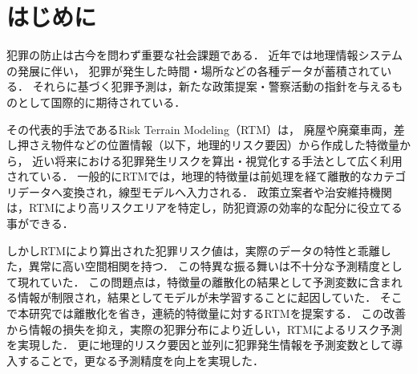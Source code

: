\def\Style{``jsaiac.sty''}
\def\BibTeX{{\rm B\kern-.05em{\sc i\kern-.025em b}\kern-.08em%
 T\kern-.1667em\lower.7ex\hbox{E}\kern-.125emX}}
\def\JBibTeX{\leavevmode\lower .6ex\hbox{J}\kern-0.15em\BibTeX}
\def\LaTeXe{\LaTeX\kern.15em2$_{\textstyle\varepsilon}$}


\maketitle

\section{はじめに}
犯罪の防止は古今を問わず重要な社会課題である．
近年では地理情報システムの発展に伴い，
犯罪が発生した時間・場所などの各種データが蓄積されている\cite{ChicagoDataPortal}．
それらに基づく犯罪予測は，新たな政策提案・警察活動の指針を与えるものとして国際的に期待されている\cite{犯罪予測}．

その代表的手法であるRisk Terrain Modeling（RTM）\cite{caplan2015risk}は，
廃屋や廃棄車両，差し押さえ物件などの位置情報（以下，地理的リスク要因）から作成した特徴量から，
近い将来における犯罪発生リスクを算出・視覚化する手法として広く利用されている\cite{地理的犯罪予測研究の潮流}．
一般的にRTMでは，地理的特徴量は前処理を経て離散的なカテゴリデータへ変換され，線型モデルへ入力される\cite{犯罪予測, caplan2015risk}．
政策立案者や治安維持機関は，RTMにより高リスクエリアを特定し，防犯資源の効率的な配分に役立てる事ができる\cite{犯罪予測}．

しかしRTMにより算出された犯罪リスク値は，実際のデータの特性と乖離した，異常に高い空間相関を持つ．
この特異な振る舞いは不十分な予測精度として現れていた．
この問題点は，特徴量の離散化の結果として予測変数に含まれる情報が制限され，結果としてモデルが未学習することに起因していた．
そこで本研究では離散化を省き，連続的特徴量に対するRTMを提案する．
この改善から情報の損失を抑え，実際の犯罪分布により近しい，RTMによるリスク予測を実現した．
更に地理的リスク要因と並列に犯罪発生情報を予測変数として導入することで，更なる予測精度を向上を実現した．

